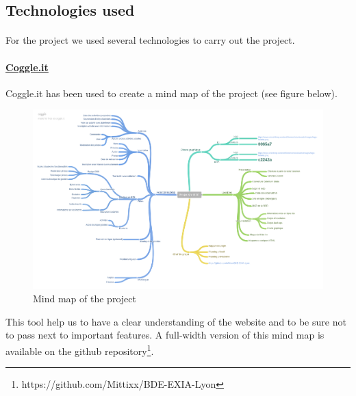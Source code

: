 		\subsection{Technologies used}
			\paragraph{}
				For the project we used several technologies to carry out the project.

			\paragraph{\href{https://coggle.it/diagram/WO3RE-56tgABcyUc}{Coggle.it}}
			Coggle.it has been used to create a mind map of the project (see figure below).

			\begin{figure}[h]
				\centering
				\includegraphics[scale=0.25]{img/Projet_site_BDE.png}
				\caption{Mind map of the project}
			\end{figure}

			This tool help us to have a clear understanding of the website and to be sure not to pass next to important features. A full-width version of this mind map is available on the github repository\footnote{https://github.com/Mittixx/BDE-EXIA-Lyon}.

